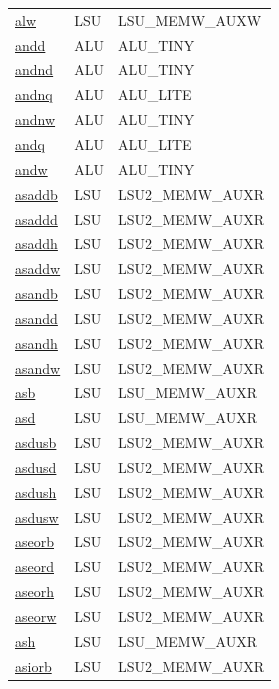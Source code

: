 \begin{small}
\begin{longtable}[l]{l l l}
\hyperlink{lvx.alw}{alw} & LSU & LSU\_MEMW\_AUXW \\ 
\hyperlink{lvx.andd}{andd} & ALU & ALU\_TINY \\ 
\hyperlink{lvx.andnd}{andnd} & ALU & ALU\_TINY \\ 
\hyperlink{lvx.andnq}{andnq} & ALU & ALU\_LITE \\ 
\hyperlink{lvx.andnw}{andnw} & ALU & ALU\_TINY \\ 
\hyperlink{lvx.andq}{andq} & ALU & ALU\_LITE \\ 
\hyperlink{lvx.andw}{andw} & ALU & ALU\_TINY \\ 
\hyperlink{lvx.asaddb}{asaddb} & LSU & LSU2\_MEMW\_AUXR \\ 
\hyperlink{lvx.asaddd}{asaddd} & LSU & LSU2\_MEMW\_AUXR \\ 
\hyperlink{lvx.asaddh}{asaddh} & LSU & LSU2\_MEMW\_AUXR \\ 
\hyperlink{lvx.asaddw}{asaddw} & LSU & LSU2\_MEMW\_AUXR \\ 
\hyperlink{lvx.asandb}{asandb} & LSU & LSU2\_MEMW\_AUXR \\ 
\hyperlink{lvx.asandd}{asandd} & LSU & LSU2\_MEMW\_AUXR \\ 
\hyperlink{lvx.asandh}{asandh} & LSU & LSU2\_MEMW\_AUXR \\ 
\hyperlink{lvx.asandw}{asandw} & LSU & LSU2\_MEMW\_AUXR \\ 
\hyperlink{lvx.asb}{asb} & LSU & LSU\_MEMW\_AUXR \\ 
\hyperlink{lvx.asd}{asd} & LSU & LSU\_MEMW\_AUXR \\ 
\hyperlink{lvx.asdusb}{asdusb} & LSU & LSU2\_MEMW\_AUXR \\ 
\hyperlink{lvx.asdusd}{asdusd} & LSU & LSU2\_MEMW\_AUXR \\ 
\hyperlink{lvx.asdush}{asdush} & LSU & LSU2\_MEMW\_AUXR \\ 
\hyperlink{lvx.asdusw}{asdusw} & LSU & LSU2\_MEMW\_AUXR \\ 
\hyperlink{lvx.aseorb}{aseorb} & LSU & LSU2\_MEMW\_AUXR \\ 
\hyperlink{lvx.aseord}{aseord} & LSU & LSU2\_MEMW\_AUXR \\ 
\hyperlink{lvx.aseorh}{aseorh} & LSU & LSU2\_MEMW\_AUXR \\ 
\hyperlink{lvx.aseorw}{aseorw} & LSU & LSU2\_MEMW\_AUXR \\ 
\hyperlink{lvx.ash}{ash} & LSU & LSU\_MEMW\_AUXR \\ 
\hyperlink{lvx.asiorb}{asiorb} & LSU & LSU2\_MEMW\_AUXR \\ 

\end{longtable}
\end{small}
